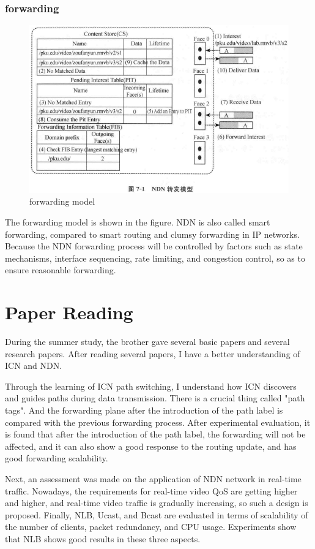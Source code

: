 \documentclass[conference]{IEEEtran}
\begin{document}
\subsubsection{forwarding}
\begin{figure}[htbp]
    \centerline{\includegraphics{forwarding model.png}}
    \caption{forwarding model}
    \label{fig}
\end{figure}
The forwarding model is shown in the figure. NDN is also called smart forwarding, compared to smart routing and clumsy forwarding in IP networks. Because the NDN forwarding process will be controlled by factors such as state mechanisms, interface sequencing, rate limiting, and congestion control, so as to ensure reasonable forwarding.


\section{Paper Reading}

During the summer study, the brother gave several basic papers and several research papers. 
After reading several papers, I have a better understanding of ICN and NDN.


Through the learning of ICN path switching, I understand how ICN discovers 
and guides paths during data transmission. There is a crucial thing called "path tags". 
And the forwarding plane after the introduction of the path label is 
compared with the previous forwarding process. After experimental evaluation, 
it is found that after the introduction of the path label, the forwarding will not be affected, 
and it can also show a good response to the routing update, and has good forwarding scalability.


Next, an assessment was made on the application of NDN network in real-time traffic. 
Nowadays, the requirements for real-time video QoS are getting higher and higher, 
and real-time video traffic is gradually increasing, so such a design is proposed. 
Finally, NLB, Ucast, and Bcast are evaluated in terms of scalability of the number of clients, 
packet redundancy, and CPU usage. Experiments show that NLB shows good results in these three aspects.
\end{document}
